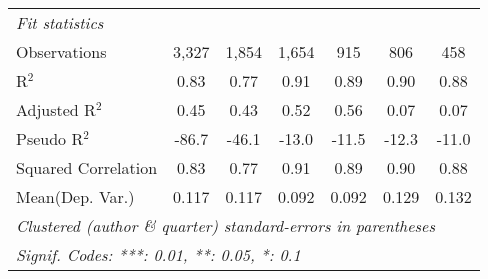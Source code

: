 \begin{tabular}{lcccccc}
   \midrule
   \emph{Fit statistics}\\
   Observations                                               & 3,327   & 1,854       & 1,654         & 915           & 806     & 458\\  
   R$^2$                                                      & 0.83    & 0.77        & 0.91          & 0.89          & 0.90    & 0.88\\  
   Adjusted R$^2$                                             & 0.45    & 0.43        & 0.52          & 0.56          & 0.07    & 0.07\\  
   Pseudo R$^2$                                               & -86.7   & -46.1       & -13.0         & -11.5         & -12.3   & -11.0\\  
   Squared Correlation                                        & 0.83    & 0.77        & 0.91          & 0.89          & 0.90    & 0.88\\  
Mean(Dep. Var.) & 0.117 & 0.117 & 0.092 & 0.092 & 0.129 & 0.132 \\
   \midrule \midrule
   \multicolumn{7}{l}{\emph{Clustered (author \& quarter) standard-errors in parentheses}}\\
   \multicolumn{7}{l}{\emph{Signif. Codes: ***: 0.01, **: 0.05, *: 0.1}}\\
\end{tabular}
\par\endgroup
